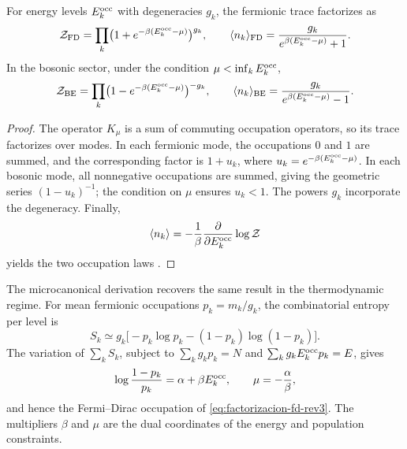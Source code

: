 \begin{theorem}
\label{thm:factorizacion-gran-canonica-rev3}
For energy levels \(E_k^{\rm occ}\) with degeneracies \(g_k\), the
fermionic trace factorizes as
\begin{equation}
 \mathcal Z_{\rm FD}
 =\prod_k\bigl(1+e^{-\beta(E_k^{\rm occ}-\mu)}\bigr)^{g_k},
 \qquad
 \langle n_k\rangle_{\rm FD}
 =\frac{g_k}{e^{\beta(E_k^{\rm occ}-\mu)}+1}.
 \label{eq:factorizacion-fd-rev3}
\end{equation}
In the bosonic sector, under the condition
\(\mu<\inf_kE_k^{\rm occ}\),
\begin{equation}
 \mathcal Z_{\rm BE}
 =\prod_k\bigl(1-e^{-\beta(E_k^{\rm occ}-\mu)}\bigr)^{-g_k},
 \qquad
 \langle n_k\rangle_{\rm BE}
 =\frac{g_k}{e^{\beta(E_k^{\rm occ}-\mu)}-1}.
 \label{eq:factorizacion-be-rev3}
\end{equation}
\end{theorem}

\begin{proof}
The operator \(K_\mu\) is a sum of commuting occupation operators, so
its trace factorizes over modes. In each fermionic mode, the
occupations \(0\) and \(1\) are summed, and the corresponding factor is
\(1+u_k\), where
\(u_k=e^{-\beta(E_k^{\rm occ}-\mu)}\). In each bosonic mode, all
nonnegative occupations are summed, giving the geometric series
\((1-u_k)^{-1}\); the condition on \(\mu\) ensures \(u_k<1\). The
powers \(g_k\) incorporate the degeneracy. Finally,
\[
 \langle n_k\rangle
 =-\frac1\beta\frac{\partial}{\partial E_k^{\rm occ}}
   \log\mathcal Z
\]
yields the two occupation laws
\cite{Bose1924,Einstein1924,Fermi1926,Dirac1926,Pathria2011}.
\end{proof}

The microcanonical derivation recovers the same result in the
thermodynamic regime. For mean fermionic occupations
\(p_k=m_k/g_k\), the combinatorial entropy per level is
\begin{equation}
 S_k\simeq
 g_k\bigl[-p_k\log p_k-(1-p_k)\log(1-p_k)\bigr].
 \label{eq:entropia-fd-nivel-rev3}
\end{equation}
The variation of \(\sum_kS_k\), subject to
\(\sum_kg_kp_k=N\) and
\(\sum_kg_kE_k^{\rm occ}p_k=E\), gives
\begin{equation}
 \log\frac{1-p_k}{p_k}=\alpha+\beta E_k^{\rm occ},
 \qquad
 \mu=-\frac{\alpha}{\beta},
 \label{eq:variacion-fd-rev3}
\end{equation}
and hence the Fermi--Dirac occupation of
\eqref{eq:factorizacion-fd-rev3}. The multipliers \(\beta\) and \(\mu\)
are the dual coordinates of the energy and population constraints.

